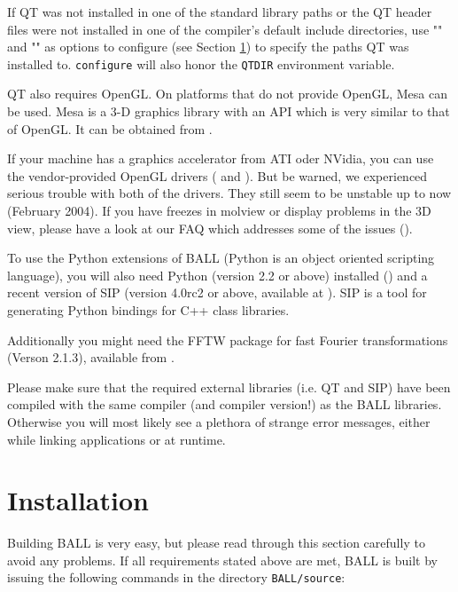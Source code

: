 If QT was not installed in one of the standard library paths or the
QT header files were not installed in one of the compiler's default
include directories, use \mbox{""} and
\mbox{""} as options to configure (see
Section \ref{section:building-ball}) to specify the paths QT was installed
to. {\tt configure} will also honor the {\tt QTDIR} environment variable.

QT also requires OpenGL. On platforms that do not provide OpenGL, Mesa can
be used. Mesa is a 3-D graphics library with an API which is 
very similar to that of OpenGL. It can be obtained from 
.

If your machine has a graphics accelerator from ATI oder NVidia, 
you can use the vendor-provided OpenGL drivers (
and ).
But be warned, we experienced serious trouble with both of the drivers. They
still seem to be unstable up to now (February 2004). If you have freezes in
molview or display problems in the 3D view, please have a look at our FAQ
which addresses some of the issues
().

To use the Python extensions of BALL (Python is an object oriented
scripting language), you will also need Python (version 2.2 or above) installed
() and a recent version of SIP (version 4.0rc2 or
above, available at ). SIP is a tool
for generating Python bindings for C++ class libraries.

Additionally you might need the FFTW package for fast Fourier
transformations (Verson 2.1.3), available from .

Please make sure that the required external \CPP libraries (i.e. QT and SIP)
have been compiled with the same compiler (and compiler version!) as the BALL
libraries. Otherwise you will most likely see a plethora of strange error
messages, either while linking applications or at runtime.

\section{Installation}
\label{section:building-ball}

Building BALL is very easy, but please read through this section carefully to
avoid any problems.  If all requirements stated above are met, BALL is built
by issuing the following commands in the directory {\tt BALL/source}:

